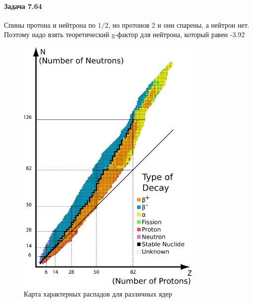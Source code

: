 \documentclass[12pt]{article}
\begin{document}
\paragraph{Задача 7.64} Спины протона и нейтрона по $1/2$, но протонов 2 и они спарены, а нейтрон нет. Поэтому надо взять теоретический g-фактор для нейтрона, который равен -3.92

\begin{figure}[h]
    \centering
    \includegraphics[width=0.8\textwidth,height=\textheight,keepaspectratio]{Seminar_09/pics/pic_table_isotopes.png}
    \caption{Карта характерных распадов для различных ядер}
    \label{fig:sem_09_isotopes}
\end{figure}
\end{document}
